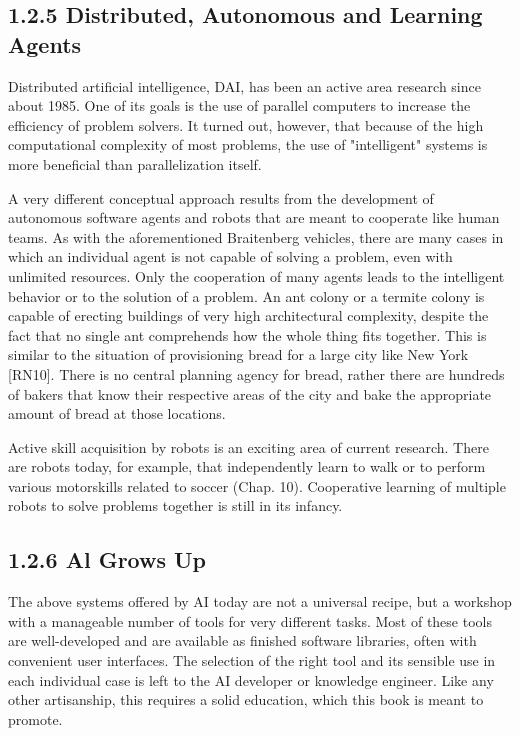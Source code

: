 \documentclass[10pt]{book}
\begin{document}
\subsection*{1.2.5 Distributed, Autonomous and Learning Agents}
Distributed artificial intelligence, DAI, has been an active area research since about 1985. One of its goals is the use of parallel computers to increase the efficiency of problem solvers. It turned out, however, that because of the high computational complexity of most problems, the use of "intelligent" systems is more beneficial than parallelization itself.

A very different conceptual approach results from the development of autonomous software agents and robots that are meant to cooperate like human teams. As with the aforementioned Braitenberg vehicles, there are many cases in which an individual agent is not capable of solving a problem, even with unlimited resources. Only the cooperation of many agents leads to the intelligent behavior or to the solution of a problem. An ant colony or a termite colony is capable of erecting buildings of very high architectural complexity, despite the fact that no single ant comprehends how the whole thing fits together. This is similar to the situation of provisioning bread for a large city like New York [RN10]. There is no central planning agency for bread, rather there are hundreds of bakers that know their respective areas of the city and bake the appropriate amount of bread at those locations.

Active skill acquisition by robots is an exciting area of current research. There are robots today, for example, that independently learn to walk or to perform\\
various motorskills related to soccer (Chap. 10). Cooperative learning of multiple robots to solve problems together is still in its infancy.


\subsection*{1.2.6 Al Grows Up}
The above systems offered by AI today are not a universal recipe, but a workshop with a manageable number of tools for very different tasks. Most of these tools are well-developed and are available as finished software libraries, often with convenient user interfaces. The selection of the right tool and its sensible use in each individual case is left to the AI developer or knowledge engineer. Like any other artisanship, this requires a solid education, which this book is meant to promote.
\end{document}
